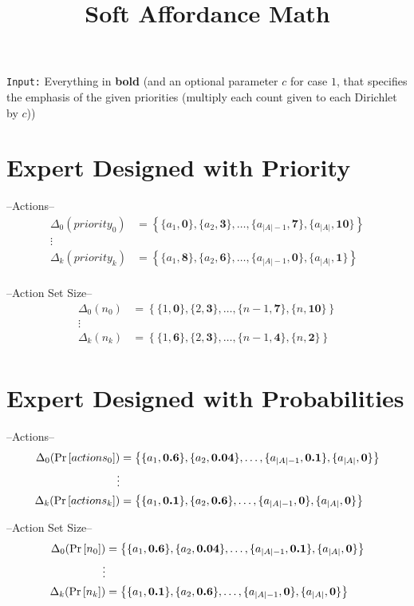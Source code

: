 \documentclass[11pt]{article}
\title{Soft Affordance Math}
\date{}
\begin{document}
\maketitle

\noindent \texttt{Input:} Everything in {\bf bold} (and an optional parameter $c$ for case $1$, that specifies the emphasis of the given priorities (multiply each count given to each Dirichlet by $c$))

\section{Expert Designed with Priority}
\noindent --Actions--
\begin{align*}
\Delta_0(priority_0) &=\left\{\{a_1,\boldsymbol{0}\},\{a_2,\boldsymbol{3}\}, \ldots, \{a_{|A| - 1},\boldsymbol{7}\}, \{a_{|A|},\boldsymbol{10}\} \right\} \\
\vdots \\
\Delta_k(priority_k) &= \left\{\{a_1,\boldsymbol{8}\},\{a_2,\boldsymbol{6}\}, \ldots, \{a_{|A| - 1},\boldsymbol{0}\}, \{a_{|A|},\boldsymbol{1}\} \right\} \\
\end{align*}

\noindent --Action Set Size--
\begin{align*}
\Delta_0(n_0) &= \left\{\{1,\boldsymbol{0}\},\{2,\boldsymbol{3}\}, \ldots, \{n-1, \boldsymbol{7}\}, \{n,\boldsymbol{10}\} \right\} \\
\vdots \\
\Delta_k(n_k) &= \left\{\{1,\boldsymbol{6}\},\{2,\boldsymbol{3}\}, \ldots, \{n-1, \boldsymbol{4}\}, \{n,\boldsymbol{2}\} \right\} \\
\end{align*}

\section{Expert Designed with Probabilities}
\noindent --Actions--
\begin{align*}
\Delta_0(\text{Pr} \left[ actions_0 \right]) &= \left\{\{a_1,\boldsymbol{0.6}\},\{a_2,\boldsymbol{0.04}\}, \ldots, \{a_{|A| - 1},\boldsymbol{0.1}\}, \{a_{|A|},\boldsymbol{0}\} \right\} \\
\vdots \\
\Delta_k(\text{Pr} \left[ actions_k \right]) &= \left\{\{a_1,\boldsymbol{0.1}\},\{a_2,\boldsymbol{0.6}\}, \ldots, \{a_{|A| - 1},\boldsymbol{0}\}, \{a_{|A|},\boldsymbol{0}\} \right\} \\
\end{align*}

\noindent --Action Set Size--
\begin{align*}
\Delta_0(\text{Pr} \left[ n_0 \right]) &= \left\{\{a_1,\boldsymbol{0.6}\},\{a_2,\boldsymbol{0.04}\}, \ldots, \{a_{|A| - 1},\boldsymbol{0.1}\}, \{a_{|A|},\boldsymbol{0}\} \right\} \\
\vdots \\
\Delta_k(\text{Pr} \left[ n_k \right]) &= \left\{\{a_1,\boldsymbol{0.1}\},\{a_2,\boldsymbol{0.6}\}, \ldots, \{a_{|A| - 1},\boldsymbol{0}\}, \{a_{|A|},\boldsymbol{0}\} \right\} \\
\end{align*}
\end{document}
